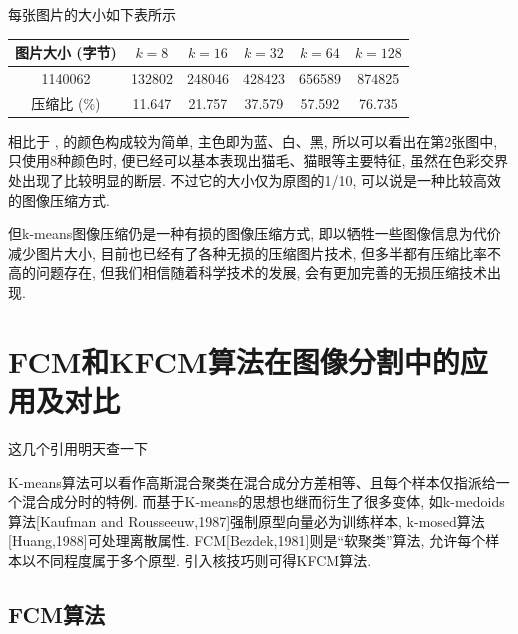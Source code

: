 \documentclass[lang=cn,11pt]{elegantpaper}
\begin{document}
每张图片的大小如下表所示
\begin{table}[ht]
    \centering
    \begin{tabular}{c|ccccc}
    \hline
    图片大小 (字节)  & $k=8$    & $k=16$   & $k=32$   & $k=64$   & $k=128$  \\ \hline
    1140062  & 132802 & 248046 & 428423 & 656589 & 874825 \\
    压缩比 (\%) & 11.647 & 21.757 & 37.579 & 57.592 & 76.735 \\ \hline
    \end{tabular}
\end{table}

相比于 ,  的颜色构成较为简单, 主色即为蓝、白、黑, 所以可以看出在第2张图中, 只使用8种颜色时, 便已经可以基本表现出猫毛、猫眼等主要特征, 虽然在色彩交界处出现了比较明显的断层. 不过它的大小仅为原图的1/10, 可以说是一种比较高效的图像压缩方式. 









但k-means图像压缩仍是一种有损的图像压缩方式, 即以牺牲一些图像信息为代价减少图片大小, 目前也已经有了各种无损的压缩图片技术, 但多半都有压缩比率不高的问题存在, 但我们相信随着科学技术的发展, 会有更加完善的无损压缩技术出现. 










\section{FCM和KFCM算法在图像分割中的应用及对比}
\Huge 这几个引用明天查一下

\normalsize
K-means算法可以看作高斯混合聚类在混合成分方差相等、且每个样本仅指派给一个混合成分时的特例. 而基于K-means的思想也继而衍生了很多变体, 如k-medoids算法[Kaufman and Rousseeuw,1987]强制原型向量必为训练样本, k-mosed算法[Huang,1988]可处理离散属性. FCM[Bezdek,1981]则是“软聚类”算法, 允许每个样本以不同程度属于多个原型. 引入核技巧则可得KFCM算法. 
\subsection{FCM算法}







\newpage
\nocite{*}



\end{document}
